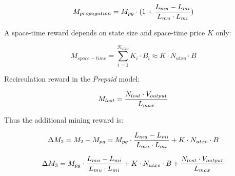 \documentclass[]{llncs}   %
\newcommand{\authnote}[2]{\marginpar{\parbox{\marginparwidth}{\tiny %
  \textsf{#1 {\textcolor{blue}{notes: #2}}}}}%
  \textcolor{blue}{\textbf{\dag}}}
\newcommand{\authnote}[2]{
  \textsf{#1 \textcolor{blue}{: #2}}}
\newcommand{\authnote}[2]{}
\newcommand{\dnote}[1]{{\authnote{\textcolor{red}{Dima notes}}{#1}}}
\newcommand{\esse}{\textit{SSE}}
\newcommand{\ignore}[1]{} %
\begin{document}
\begin{equation}
M_{propagation} = M_{pg} \cdot(1 + {{L_{mu}-L_{mi}} \over {L_{mu} \cdot L_{mi}}})
\end{equation}



\ignore{
  In Section \ref{sec:flow} we have noticed, that \esse{} users have an incentive to actively use their coins and propagation reward is correlated with space-time reward:

  \begin{equation}
    M_{propagation} = r_{flow} \cdot M_{space-time} + M_{pg}
  \end{equation}

  where $C$ is non-negative constant. 
}

A space-time reward depends on state size and space-time price $K$ only:

\begin{equation}
M_{space-time} = \sum_{i=1}^{N_{utxo}} K_i \cdot B_i \approx K \cdot N_{utxo} \cdot B
\end{equation}

Recirculation reward in the \textit{Prepaid} model:


\begin{equation}
M_{lost} = {N_{lost} \cdot V_{output} \over L_{max}}
\end{equation}

Thus the additional mining reward is:

\begin{equation}
\Delta M_2 = M_2 - M_{pg} = M_{pg} \cdot {{L_{mu}-L_{mi}} \over {L_{mu} \cdot L_{mi}}} + K \cdot N_{utxo} \cdot B
\end{equation}

\begin{equation}
\Delta M_3 = M_{pg} \cdot {{L_{mu}-L_{mi}} \over {L_{mu} \cdot L_{mi}}} + K \cdot N_{utxo} \cdot B + {N_{lost} \cdot V_{output} \over L_{max}}
\end{equation}
\end{document}

